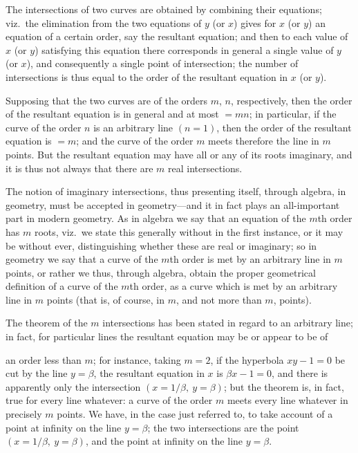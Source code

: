 \documentclass[12pt,a4paper,oneside]{book}
\begin{document}
The intersections of two curves are obtained by combining their equations; viz.\ the elimination from the two equations of $y$ (or $x$) gives for $x$ (or $y$) an equation of a certain order, say the resultant equation; and then to each value of $x$ (or $y$) satisfying this equation there corresponds in general a single value of $y$ (or $x$), and consequently a single point of intersection; the number of intersections is thus equal to the order of the resultant equation in $x$ (or $y$).

Supposing that the two curves are of the orders $m$, $n$, respectively, then the order of the resultant equation is in general and at most $=mn$; in particular, if the curve of the order $n$ is an arbitrary line $(n=1)$, then the order of the resultant equation is $=m$; and the curve of the order $m$ meets therefore the line in $m$ points. But the resultant equation may have all or any of its roots imaginary, and it is thus not always that there are $m$ real intersections.

The notion of imaginary intersections, thus presenting itself, through algebra, in geometry, must be accepted in geometry---and it in fact plays an all-important part in modern geometry. As in algebra we say that an equation of the $m$th order has $m$ roots, viz.\ we state this generally without in the first instance, or it may be without ever, distinguishing whether these are real or imaginary; so in geometry we say that a curve of the $m$th order is met by an arbitrary line in $m$ points, or rather we thus, through algebra, obtain the proper geometrical definition of a curve of the $m$th order, as a curve which is met by an arbitrary line in $m$ points (that is, of course, in $m$, and not more than $m$, points).

The theorem of the $m$ intersections has been stated in regard to an arbitrary line; in fact, for particular lines the resultant equation may be or appear to be of

\newpage
an order less than $m$; for instance, taking $m=2$, if the hyperbola $xy-1=0$ be cut by the line $y=\beta$, the resultant equation in $x$ is $\beta x-1=0$, and there is apparently only the intersection $(x=1/\beta,\ y=\beta)$; but the theorem is, in fact, true for every line whatever: a curve of the order $m$ meets every line whatever in precisely $m$ points. We have, in the case just referred to, to take account of a point at infinity on the line $y=\beta$; the two intersections are the point $(x=1/\beta,\ y=\beta)$, and the point at infinity on the line $y=\beta$.
\end{document}
